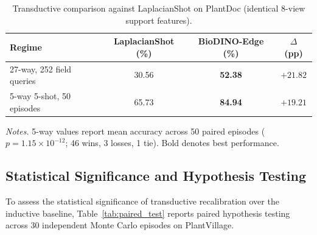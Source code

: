 \documentclass[preprint,12pt]{elsarticle}
\begin{document}
\begin{table}[htbp]
\caption{Transductive comparison against LaplacianShot on PlantDoc (identical 8-view support features).}
\label{tab:plantdoc_laplacian}
\centering

\footnotesize
\setlength{\tabcolsep}{4pt}
\begin{tabular*}{\columnwidth}{@{\extracolsep{\fill}}lccc}
\toprule
\textbf{Regime} & \textbf{LaplacianShot (\%)} & \textbf{BioDINO-Edge (\%)} & \textbf{$\Delta$ (pp)} \\
\midrule
27-way, 252 field queries & 30.56 & \textbf{52.38} & $+21.82$ \\
5-way 5-shot, 50 episodes & 65.73 & \textbf{84.94} & $+19.21$ \\
\bottomrule
\end{tabular*}

\vspace{3pt}
\begin{minipage}{\columnwidth}
\footnotesize
\textit{Notes.} 5-way values report mean accuracy across 50 paired episodes ($p = 1.15 \times 10^{-12}$; 46 wins, 3 losses, 1 tie). Bold denotes best performance.
\end{minipage}
\end{table}

\subsection{Statistical Significance and Hypothesis Testing}
\label{sec:significance}
\label{sec:transductive_validation}

To assess the statistical significance of transductive recalibration over the inductive baseline, Table~\ref{tab:paired_test} reports paired hypothesis testing across 30 independent Monte Carlo episodes on PlantVillage.
\end{document}
